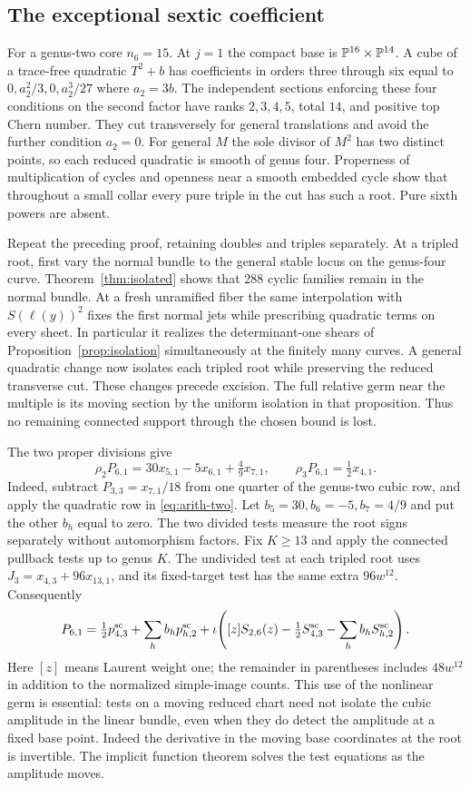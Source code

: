 \subsection{The exceptional sextic coefficient}
For a genus-two core $n_6=15$. At $j=1$ the compact base is
$\mathbb P^{16}\times\mathbb P^{14}$. A cube of a trace-free quadratic
$T^2+b$ has coefficients in orders three through six equal to
$0,a_2^2/3,0,a_2^3/27$ where $a_2=3b$. The independent sections
enforcing these four conditions on the second factor have ranks
$2,3,4,5$, total $14$, and positive top Chern number. They cut
transversely for general translations and avoid the further condition
$a_2=0$. For general $M$ the sole divisor of $M^2$ has two distinct
points, so each reduced quadratic is smooth of genus four. Properness
of multiplication of cycles and openness near a smooth embedded
cycle show that throughout a small collar every pure triple in the
cut has such a root. Pure sixth powers are absent.

Repeat the preceding proof, retaining doubles and triples separately.
At a tripled root, first vary the normal bundle to the general stable
locus on the genus-four curve. Theorem~\ref{thm:isolated} shows that
288 cyclic families remain in the normal bundle. At a fresh unramified
fiber the same interpolation with $S(\ell(y))^2$ fixes the first
normal jets while prescribing quadratic terms on every sheet. In
particular it realizes the determinant-one shears of
Proposition~\ref{prop:isolation} simultaneously at the finitely many
curves. A general quadratic change now isolates each tripled root
while preserving the reduced transverse cut. These changes precede
excision. The full relative germ near the multiple is its moving
section by the uniform isolation in that proposition. Thus no
remaining connected support through the chosen bound is lost.

The two proper divisions give
\[
 \rho_2P_{6,1}=30x_{5,1}-5x_{6,1}+\tfrac49x_{7,1},\qquad
 \rho_3P_{6,1}=\tfrac12 x_{4,1}.
\]
Indeed, subtract $P_{3,3}=x_{7,1}/18$ from one quarter of the
genus-two cubic row, and apply the quadratic row in
\eqref{eq:arith-two}. Let $b_5=30,b_6=-5,b_7=4/9$ and put the other
$b_h$ equal to zero. The two divided tests measure the root signs
separately without automorphism factors. Fix $K\ge13$ and apply the
connected pullback tests up to genus $K$. The undivided test at
each tripled root uses $J_3=x_{4,3}+96x_{13,1}$, and its
fixed-target test has the same extra $96w^{12}$. Consequently
\[
 P_{6,1}=\tfrac12p_{4,3}^{\rm sc}+\sum_h b_hp_{h,2}^{\rm sc}
           +\iota\!\left( [z]S_{2,6}(z)-\tfrac12 S_{4,3}^{\rm sc}
                                      -\sum_h b_hS_{h,2}^{\rm sc}\right).
\]
Here $[z]$ means Laurent weight one; the remainder in parentheses
includes $48w^{12}$ in addition to the normalized simple-image counts.
This use of the nonlinear germ is essential: tests on a moving
reduced chart need not isolate the cubic amplitude in the linear
bundle, even when they do detect the amplitude at a fixed base point.
Indeed the derivative in the moving base coordinates at the root is
invertible. The implicit function theorem solves the test equations
as the amplitude moves.

